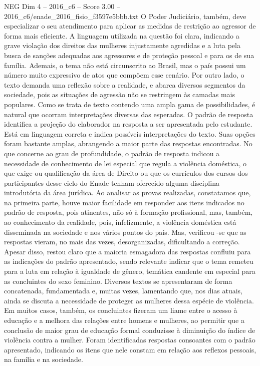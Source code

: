 \begin{textsample}{NEG Dim 4 – 2016\_c6 – Score 3.00 – 2016\_c6/enade\_2016\_fisio\_f3597e5bbb.txt}
O Poder Judiciário, também, deve especializar o seu atendimento para aplicar as medidas de restrição ao agressor de forma mais eficiente.
A linguagem utilizada na questão foi clara, indicando a grave violação dos direitos das mulheres injustamente agredidas e a luta pela busca de sanções adequadas aos agressores e de proteção pessoal e para os de sua família.
Ademais, o tema não está circunscrito ao Brasil, mas o país possui um número muito expressivo de atos que compõem esse cenário.
Por outro lado, o texto demanda uma reflexão sobre a realidade, e abarca diversos segmentos da sociedade, pois as situações de agressão não se restringem às camadas mais populares.
Como se trata de texto contendo uma ampla gama de possibilidades, é natural que ocorram interpretações diversas das esperadas.
O padrão de resposta identifica a projeção do elaborador na resposta a ser apresentada pelo estudante.
Está em linguagem correta e indica possíveis interpretações do texto.
Suas opções foram bastante amplas, abrangendo a maior parte das respostas encontradas.
No que concerne ao grau de profundidade, o padrão de resposta indicou a necessidade de conhecimento de lei especial que regula a violência doméstica, o que exige ou qualificação da área de Direito ou que os currículos dos cursos dos participantes desse ciclo do Enade tenham oferecido alguma disciplina introdutória da área jurídica.
Ao analisar as provas realizadas, constatamos que, na primeira parte, houve maior facilidade em responder aos itens indicados no padrão de resposta, pois atinentes, não só à formação profissional, mas, também, ao conhecimento da realidade, pois, infelizmente, a violência doméstica está disseminada na sociedade e nos vários pontos do país.
Mas, verificou -se que as respostas vieram, no mais das vezes, desorganizadas, dificultando a correção.
Apesar disso, restou claro que a maioria esmagadora das respostas confluiu para as indicações do padrão apresentado, sendo relevante indicar que o tema remeteu para a luta em relação à igualdade de gênero, temática candente em especial para as concluintes do sexo feminino.
Diversos textos se apresentaram de forma concatenada, fundamentada e, muitas vezes, lamentando que, nos dias atuais, ainda se discuta a necessidade de proteger as mulheres dessa espécie de violência.
Em muitos casos, também, os concluintes fizeram um liame entre o acesso à educação e a melhora das relações entre homens e mulheres, ao permitir que a conclusão de maior grau de educação formal conduzisse à diminuição do índice de violência contra a mulher.
Foram identificadas respostas consoantes com o padrão apresentado, indicando os itens que nele constam em relação aos reflexos pessoais, na família e na sociedade.

\end{textsample}

